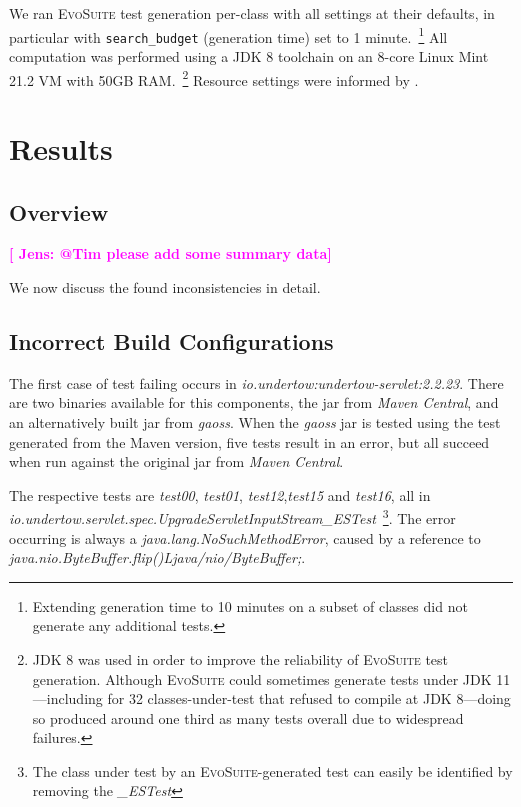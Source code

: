 \documentclass[conference]{IEEEtran}
\makeatletter
\newcommand{\evosuite}{\textsc{EvoSuite}\@\xspace}
\newcommand{\jens}[1]{\textbf{\textcolor{magenta}{[ \ding{46}Jens: #1]}}}
\makeatother
\begin{document}
We ran \evosuite test generation per-class with all settings at their defaults, in particular with \texttt{search\_budget} (generation time) set to 1 minute.~\footnote{Extending generation time to 10 minutes on a subset of classes did not generate any additional tests.}
All computation was performed using a JDK 8 toolchain on an 8-core Linux Mint 21.2 VM with 50GB RAM.~\footnote{JDK 8 was used in order to improve the reliability of \evosuite test generation. Although \evosuite could sometimes generate tests under JDK 11---including for 32 classes-under-test that refused to compile at JDK 8---doing so produced around one third as many tests overall due to widespread failures.}
Resource settings were informed by \cite{jahangirova2023sbft}. 


\section{Results}
\label{sec:results}

\subsection{Overview}

\jens{@Tim please add some summary data}

We now discuss the found inconsistencies in detail.

\subsection{Incorrect Build Configurations}


The first case of test failing occurs in \textit{io.undertow:undertow-servlet:2.2.23}. There are two binaries available for this components, the jar from \textit{Maven Central}, and an alternatively built jar from \textit{gaoss}. When the  \textit{gaoss} jar is tested using the test generated from the Maven version, five tests result in an error, but all succeed when run against the original jar from \textit{Maven Central}.

The respective tests are \textit{test00}, \textit{test01}, \textit{test12},\textit{test15} and \textit{test16}, all in \textit{io.under\-tow.\-servlet.\-spec.UpgradeServletInputStream\_ESTest}~\footnote{The class under test by an \evosuite-generated test can easily be identified by removing the \textit{\_ESTest}}. The error occurring is always a \textit{java.lang.NoSuchMethodError}, caused by a reference to \textit{java.nio.ByteBuffer.flip()Ljava/nio/ByteBuffer;}.
\end{document}
